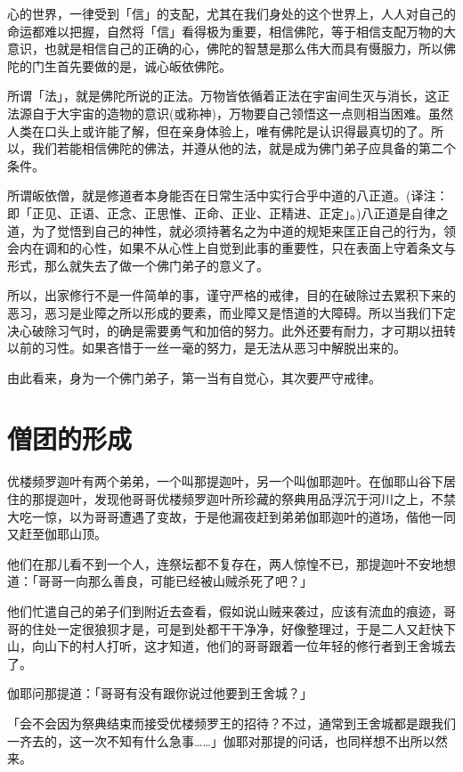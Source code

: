 \documentclass[twoside,openany]{book}
\begin{document}
心的世界，一律受到「信」的支配，尤其在我们身处的这个世界上，人人对自己的命运都难以把握，自然将「信」看得极为重要，相信佛陀，等于相信支配万物的大意识，也就是相信自己的正确的心，佛陀的智慧是那么伟大而具有慑服力，所以佛陀的门生首先要做的是，诚心皈依佛陀。

所谓「法」，就是佛陀所说的正法。万物皆依循着正法在宇宙间生灭与消长，这正法源自于大宇宙的造物的意识(或称神)，万物要自己领悟这一点则相当困难。虽然人类在口头上或许能了解，但在亲身体验上，唯有佛陀是认识得最真切的了。所以，我们若能相信佛陀的佛法，并遵从他的法，就是成为佛门弟子应具备的第二个条件。

所谓皈依僧，就是修道者本身能否在日常生活中实行合乎中道的八正道。(译注：即「正见、正语、正念、正思惟、正命、正业、正精进、正定」。)八正道是自律之道，为了觉悟到自己的神性，就必须持著名之为中道的规矩来匡正自己的行为，领会内在调和的心性，如果不从心性上自觉到此事的重要性，只在表面上守着条文与形式，那么就失去了做一个佛门弟子的意义了。

所以，出家修行不是一件简单的事，谨守严格的戒律，目的在破除过去累积下来的恶习，恶习是业障之所以形成的要素，而业障又是悟道的大障碍。所以当我们下定决心破除习气时，的确是需要勇气和加倍的努力。此外还要有耐力，才可期以扭转以前的习性。如果吝惜于一丝一毫的努力，是无法从恶习中解脱出来的。

由此看来，身为一个佛门弟子，第一当有自觉心，其次要严守戒律。

\section{僧团的形成}\label{sec3.7}

优楼频罗迦叶有两个弟弟，一个叫那提迦叶，另一个叫伽耶迦叶。在伽耶山谷下居住的那提迦叶，发现他哥哥优楼频罗迦叶所珍藏的祭典用品浮沉于河川之上，不禁大吃一惊，以为哥哥遭遇了变故，于是他漏夜赶到弟弟伽耶迦叶的道场，偕他一同又赶至伽耶山顶。

他们在那儿看不到一个人，连祭坛都不复存在，两人惊惶不已，那提迦叶不安地想道：「哥哥一向那么善良，可能已经被山贼杀死了吧？」

他们忙遣自己的弟子们到附近去查看，假如说山贼来袭过，应该有流血的痕迹，哥哥的住处一定很狼狈才是，可是到处都干干净净，好像整理过，于是二人又赶快下山，向山下的村人打听，这才知道，他们的哥哥跟着一位年轻的修行者到王舍城去了。

伽耶问那提道：「哥哥有没有跟你说过他要到王舍城？」

「会不会因为祭典结束而接受优楼频罗王的招待？不过，通常到王舍城都是跟我们一齐去的，这一次不知有什么急事……」伽耶对那提的问话，也同样想不出所以然来。
\end{document}
